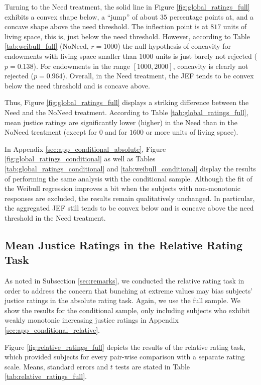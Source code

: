 \documentclass[12pt]{scrartcl}
\begin{document}
Turning to the Need treatment, the solid line in Figure \ref{fig:global_ratings_full} exhibits a convex shape below, a ``jump'' of about $35$ percentage points at, and a concave shape above the need threshold.
The inflection point is at $817$ units of living space, this is, just below the need threshold.
However, according to Table \ref{tab:weibull_full} (NoNeed, $r=1000$) the null hypothesis of concavity for endowments with living space smaller than $1000$ units is just barely not rejected ($p=0.138$).
For endowments in the range $[1000,2000]$, concavity is clearly not rejected ($p=0.964$).
Overall, in the Need treatment, the JEF tends to be convex below the need threshold and is concave above.

Thus, Figure \ref{fig:global_ratings_full} displays a striking difference between the Need and the NoNeed treatment.
According to Table \ref{tab:global_ratings_full}, mean justice ratings are significantly lower (higher) in the Need than in the NoNeed treatment (except for $0$ and for $1600$ or more units of living space).

In Appendix \ref{sec:app_conditional_absolute}, Figure \ref{fig:global_ratings_conditional} as well as Tables \ref{tab:global_ratings_conditional} and \ref{tab:weibull_conditional} display the results of performing the same analysis with the conditional sample.
Although the fit of the Weibull regression improves a bit when the subjects with non-monotonic responses are excluded, the results remain qualitatively unchanged.
In particular, the aggregated JEF still tends to be convex below and is concave above the need threshold in the Need treatment.


\subsection{Mean Justice Ratings in the Relative Rating Task}\label{sec:relative}
As noted in Subsection \ref{sec:remarks}, we conducted the relative rating task in order to address the concern that bunching at extreme values may bias subjects' justice ratings in the absolute rating task.
Again, we use the full sample.
We show the results for the conditional sample, only including subjects who exhibit weakly monotonic increasing justice ratings in Appendix \ref{sec:app_conditional_relative}.

Figure \ref{fig:relative_ratings_full} depicts the results of the relative rating task, which provided subjects for every pair-wise comparison with a separate rating scale.
Means, standard errors and $t$ tests are stated in Table \ref{tab:relative_ratings_full}.
\end{document}
